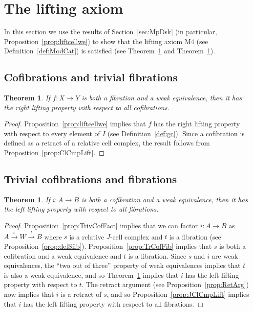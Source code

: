 \documentclass{amsart}
\numberwithin{equation}{section}
\theoremstyle{slplain}
\newtheorem{thm}[equation]{Theorem}  %
\theoremstyle{definition}
\theoremstyle{remark}
\newcommand{\thmref}{Theorem~\ref}
\newcommand{\propref}{Proposition~\ref}
\newcommand{\defref}{Definition~\ref}
\newcommand{\secref}{Section~\ref}
\begin{document}
\section{The lifting axiom}
\label{sec:lift}

In this section we use the results of \secref{sec:MpDsk} (in
particular, \propref{prop:liftcellwe}) to show that the lifting axiom
M4 (see \defref{def:ModCat}) is satisfied (see \thmref{thm:onelift}
and \thmref{thm:otherlift}).

\subsection{Cofibrations and trivial fibrations}
\label{sec:CofTFib}


\begin{thm}
  \label{thm:onelift}
  If $f\colon X \to Y$ is both a fibration and a weak equivalence,
  then it has the right lifting property with respect to all
  cofibrations.
\end{thm}

\begin{proof}
  \propref{prop:liftcellwe} implies that $f$ has the right lifting
  property with respect to every element of $I$ (see \defref{def:gc}).
  Since a cofibration is defined as a retract of a relative cell
  complex, the result follows from \propref{prop:ClCmpLift}.
\end{proof}

\subsection{Trivial cofibrations and fibrations}
\label{sec:FibTCof}

\begin{thm}
  \label{thm:otherlift}
  If $i\colon A \to B$ is both a cofibration and a weak equivalence,
  then it has the left lifting property with respect to all
  fibrations.
\end{thm}

\begin{proof}
  \propref{prop:TrivCofFact} implies that we can factor $i\colon A \to
  B$ as $A\xrightarrow{s} W \xrightarrow{t} B$ where $s$ is a relative
  $J$-cell complex and $t$ is a fibration (see
  \propref{prop:defSfib}).  \propref{prop:TrCofFib} implies that $s$
  is both a cofibration and a weak equivalence and $t$ is a fibration.
  Since $s$ and $i$ are weak equivalences, the ``two out of three''
  property of weak equivalences implies that $t$ is also a weak
  equivalence, and so \thmref{thm:onelift} implies that $i$ has the
  left lifting property with respect to $t$.  The retract argument
  (see \propref{prop:RetArg}) now implies that $i$ is a retract of
  $s$, and so \propref{prop:JClCmpLift} implies that $i$ has the left
  lifting property with respect to all fibrations.
\end{proof}
\end{document}
